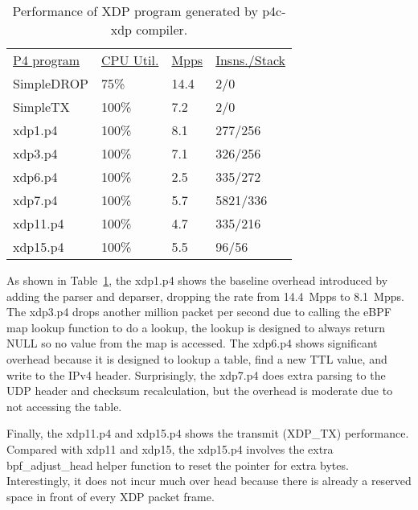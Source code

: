 \begin{table}
\centering
\small
\begin{tabular}{llll}
  \underline{P4 program} & \underline{CPU Util.} & \underline{Mpps} & \underline{Insns./Stack}\\
  SimpleDROP & 75\% & 14.4 & 2/0 \\
  SimpleTX & 100\% & 7.2 & 2/0 \\
  xdp1.p4 &  100\% &  8.1 & 277/256 \\
  xdp3.p4 &  100\% &  7.1 & 326/256 \\
  xdp6.p4 &  100\% &  2.5 & 335/272 \\
  xdp7.p4 &  100\% &  5.7 & 5821/336 \\
  xdp11.p4 &  100\% &  4.7  & 335/216 \\
  xdp15.p4 &  100\% &  5.5 & 96/56\\
\end{tabular}
\caption{\footnotesize Performance of XDP program generated by
  p4c-xdp compiler.}
\label{tab:perf}
\end{table}

As shown in Table~\ref{tab:perf}, the xdp1.p4 shows the baseline overhead
introduced by adding the parser and deparser, dropping the rate from 14.4~Mpps to
8.1~Mpps. The xdp3.p4 drops another million packet per second due to
calling the eBPF map lookup function to do a lookup, the lookup is designed
to always return NULL so no value from the map is accessed.
The xdp6.p4 shows significant overhead because it is designed to lookup
a table, find a new TTL value, and write to the IPv4 header. 
Surprisingly, the xdp7.p4 does extra parsing to the UDP header and
checksum recalculation, but the overhead is moderate due to not accessing
the table.

Finally, the xdp11.p4 and xdp15.p4 shows the transmit (XDP\_TX) performance.
Compared with xdp11 and xdp15, the xdp15.p4 involves the extra bpf\_adjust\_head helper
function to reset the pointer for extra bytes.  
Interestingly, it does not incur much over head because there is
already a reserved space in front of every XDP packet frame.

